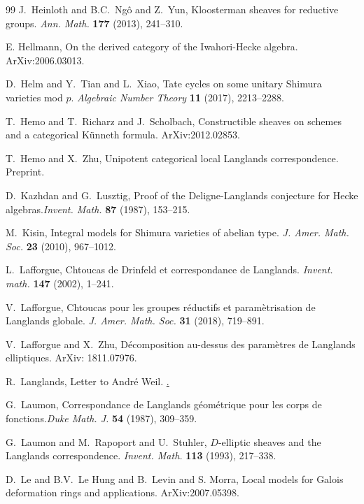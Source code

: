 \documentclass[11pt]{amsart}
\theoremstyle{definition}
\theoremstyle{definition}
\theoremstyle{definition}
\numberwithin{equation}{section}
\begin{document}
\begin{thebibliography}{99}
J.~Heinloth and B.C.~Ng\^o and Z.~Yun, Kloosterman sheaves for reductive groups. \emph{Ann. Math.} \textbf{177} (2013), 241--310.

E. Hellmann, On the derived category of the Iwahori-Hecke algebra. ArXiv:2006.03013.

D.~Helm and Y.~Tian and L.~Xiao, Tate cycles on some unitary Shimura varieties mod $p$. \emph{Algebraic Number Theory} \textbf{11} (2017), 2213--2288.

T.~Hemo and T.~Richarz and J.~Scholbach, Constructible sheaves on schemes and a categorical K\"unneth formula. ArXiv:2012.02853.

T.~Hemo and X.~Zhu, Unipotent categorical local Langlands correspondence. Preprint.

D.~Kazhdan and G.~Lusztig, Proof of the Deligne-Langlands conjecture for Hecke algebras.\emph{Invent. Math.} \textbf{87} (1987), 153--215.

M.~Kisin, Integral models for Shimura varieties of abelian type. \emph{J. Amer. Math. Soc.} \textbf{23} (2010), 967--1012.

L.~Lafforgue, Chtoucas de Drinfeld et correspondance de Langlands. \emph{Invent. math.} \textbf{147} (2002), 1--241.

V.~Lafforgue, Chtoucas pour les groupes r\'eductifs et param\`etrisation de Langlands globale. \emph{J. Amer. Math. Soc.} \textbf{31} (2018), 719--891.

V.~Lafforgue and X.~Zhu, D\'ecomposition au-dessus des param\`etres de Langlands elliptiques. ArXiv: 1811.07976.

R.~Langlands, Letter to Andr\'e Weil. \href{publications.ias.edu/rpl/paper/43}.

G.~Laumon, Correspondance de Langlands g\'eom\'etrique pour les corps de fonctions.\emph{Duke Math. J.} \textbf{54} (1987), 309--359.

G.~Laumon and M.~Rapoport and U.~Stuhler, $D$-elliptic sheaves and the Langlands correspondence. \emph{Invent. Math.} \textbf{113} (1993), 217--338.

D.~Le and B.V.~Le Hung and B.~Levin and S. Morra, Local models for Galois deformation rings and applications. ArXiv:2007.05398.


\end{thebibliography}
\end{document}
